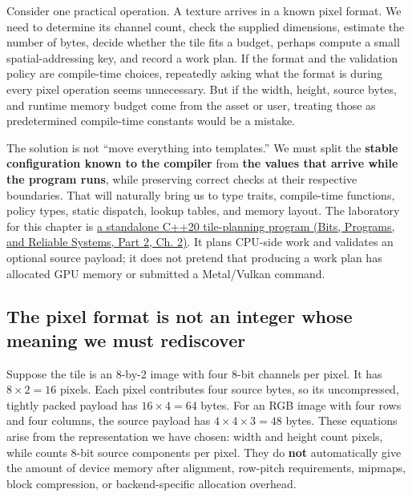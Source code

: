 Consider one practical operation. A texture arrives in a known pixel format. We need to determine its channel count, check the supplied dimensions, estimate the number of bytes, decide whether the tile fits a budget, perhaps compute a small spatial-addressing key, and record a work plan. If the format and the validation policy are compile-time choices, repeatedly asking what the format is during every pixel operation seems unnecessary. But if the width, height, source bytes, and runtime memory budget come from the asset or user, treating those as predetermined compile-time constants would be a mistake.

The solution is not ``move everything into templates.'' We must split the \textbf{stable configuration known to the compiler} from \textbf{the values that arrive while the program runs}, while preserving correct checks at their respective boundaries. That will naturally bring us to type traits, compile-time functions, policy types, static dispatch, lookup tables, and memory layout. The laboratory for this chapter is \href{../01-Bits-Programs-and-Reliable-Systems-P02/main.pdf\#nameddest=source-file-f5eb017280bb6b2ae6b1475d}{a standalone C++20 tile-planning program (Bits, Programs, and Reliable Systems, Part 2, Ch. 2)}. It plans CPU-side work and validates an optional source payload; it does not pretend that producing a work plan has allocated GPU memory or submitted a Metal/Vulkan command.

\subsection{The pixel format is not an integer whose meaning we must rediscover}\label{01-foundations-i-ch005-the-pixel-format-is-not-an-integer-whose-meaning-we-must-rediscover}

\hypertarget{01-foundations-i-ch005-the-pixel-format-is-not-an-integer-whose-meaning-we-must-rediscover}{}

Suppose the tile is an 8-by-2 image with four 8-bit channels per pixel. It has \(8\times 2=16\) pixels. Each pixel contributes four source bytes, so its uncompressed, tightly packed payload has \(16\times4=64\) bytes. For an RGB image with four rows and four columns, the source payload has \(4\times4\times3=48\) bytes. These equations arise from the representation we have chosen: width and height count pixels, while  counts 8-bit source components per pixel. They do \textbf{not} automatically give the amount of device memory after alignment, row-pitch requirements, mipmaps, block compression, or backend-specific allocation overhead.

